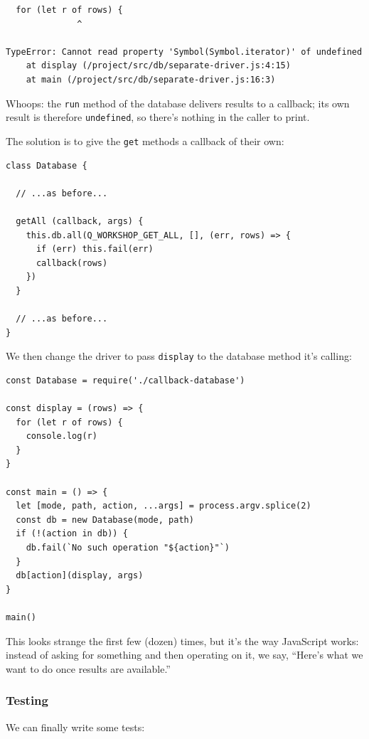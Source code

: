 \begin{verbatim}
  for (let r of rows) {
              ^

TypeError: Cannot read property 'Symbol(Symbol.iterator)' of undefined
    at display (/project/src/db/separate-driver.js:4:15)
    at main (/project/src/db/separate-driver.js:16:3)
\end{verbatim}

Whoops: the \texttt{run} method of the database delivers results to a
callback; its own result is therefore \texttt{undefined}, so there's
nothing in the caller to print.

The solution is to give the \texttt{get} methods a callback of their
own:

\begin{verbatim}
class Database {

  // ...as before...

  getAll (callback, args) {
    this.db.all(Q_WORKSHOP_GET_ALL, [], (err, rows) => {
      if (err) this.fail(err)
      callback(rows)
    })
  }

  // ...as before...
}
\end{verbatim}

We then change the driver to pass \texttt{display} to the database
method it's calling:

\begin{verbatim}
const Database = require('./callback-database')

const display = (rows) => {
  for (let r of rows) {
    console.log(r)
  }
}

const main = () => {
  let [mode, path, action, ...args] = process.argv.splice(2)
  const db = new Database(mode, path)
  if (!(action in db)) {
    db.fail(`No such operation "${action}"`)
  }
  db[action](display, args)
}

main()
\end{verbatim}

This looks strange the first few (dozen) times, but it's the way
JavaScript works: instead of asking for something and then operating on
it, we say, ``Here's what we want to do once results are available.''

\subsubsection{Testing}\label{s:db-testing}

We can finally write some tests:

